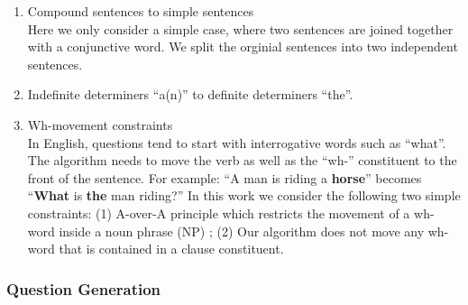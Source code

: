 \documentclass{article} %
\renewcommand{\#}[1]{\textbf{#1}}
\begin{document}
\begin{enumerate}[leftmargin=*]

\item Compound sentences to simple sentences \\ Here we only consider a simple
case, where two sentences are joined together  with a conjunctive word. We
split the orginial sentences into two independent sentences.

\item Indefinite determiners ``a(n)'' to definite determiners ``the''.

\item Wh-movement constraints \\ In English, questions tend to start with
interrogative words such as ``what''.  The algorithm needs to move the verb as
well as the ``wh-'' constituent to  the front of the sentence.  For example:
``A man is riding a \textbf{horse}'' becomes      ``\textbf{What} is
\textbf{the} man riding?'' In this work we consider the following two simple
constraints: (1) A-over-A principle which restricts the movement of a wh-word
inside a noun phrase (NP)  \cite{chomsky73}; (2) Our algorithm does not move
any wh-word that is contained in a clause constituent.

\end{enumerate}

\subsubsection{Question Generation}
\end{document}
